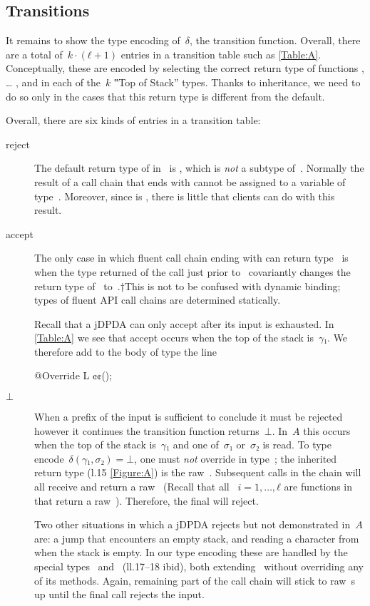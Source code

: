 \subsection{Transitions}
It remains to show the type encoding of~$δ$,
  the transition function.
Overall, there are a total of~$k·(ℓ+1)$
  entries in a transition table such as \cref{Table:A}.
Conceptually, these are encoded by selecting the correct return
  type of functions , … , and \cc{\$()} in each of the~$k$ ‟Top of Stack” types.
Thanks to inheritance, we need to do so only in the cases that this return type is different from the
  default.

Overall, there are six kinds of entries in a transition table:
\begin{description}

  \item[\textsf{reject}]
  The default return type of \cc{\$()} in~ is , which
  is \emph{not} a subtype of~. Normally the result of a call chain that ends with \cc{\$()}
  cannot be assigned to a variable of type~. Moreover, since  is ,
  there is little that clients can do with this result.

  \item[\textsf{accept}]
  The only case in which fluent call chain ending with \cc{\$()} can return
    type~ is when the type returned of the call just prior to~ covariantly
    changes the return type of~\cc{\$()} to~.†{This is not to be confused with dynamic binding;
    types of fluent API call chains are determined statically.}
  \par
  Recall that a jDPDA can only accept after its input is exhausted.
  In \cref{Table:A} we see that \textsf{accept} occurs when the top of the stack is~$γ₁$.
  We therefore add to the body of type  the line
  \begin{JAVA}
@Override L ¢\gobble$¢$();
  \end{JAVA}

  \item[$⊥$]
  When a prefix of the input is sufficient to conclude it must be rejected however it continues
    the transition function returns~$⊥$.
  In~$A$ this occurs when the top of the stack is~$γ₁$ and one of~$σ₁$ or~$σ₂$ is read.
  To type encode~$δ(γ₁,σ₂) =⊥$, one must \emph{not} override  in type~;
    the inherited return type (l.15 \cref{Figure:A}) is the raw~.
  Subsequent calls in the chain will all receive and return a raw~
    (Recall that all ~$i=1,…,ℓ$ are functions in~ that return a raw~).
  Therefore, the final \cc{\$()} will reject.
  \par
  Two other situations in which a jDPDA rejects but not demonstrated in~$A$ are:
    a \textsf{jump} that encounters an empty stack, and reading a character from when the stack is empty.
  In our type encoding these are handled by the special
    types~ and~ (ll.17--18 ibid), both extending~ without
    overriding any of its methods. Again, remaining part of the call chain will stick to
    raw~s up until the final \cc{\$()} call rejects the input.


\end{description}
